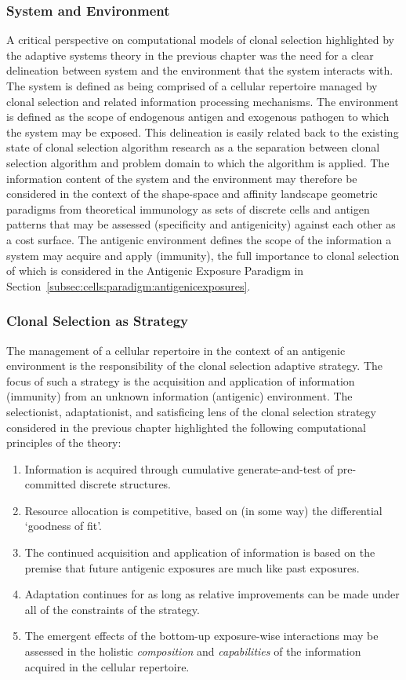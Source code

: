 \subsubsection{System and Environment}
A critical perspective on computational models of clonal selection highlighted by the adaptive systems theory in the previous chapter was the need for a clear delineation between system and the environment that the system interacts with. The system is defined as being comprised of a cellular repertoire managed by clonal selection and related information processing mechanisms. The environment is defined as the scope of endogenous antigen and exogenous pathogen to which the system may be exposed. This delineation is easily related back to the existing state of clonal selection algorithm research as a the separation between clonal selection algorithm and problem domain to which the algorithm is applied. The information content of the system and the environment may therefore be considered in the context of the shape-space and affinity landscape geometric paradigms from theoretical immunology as sets of discrete cells and antigen patterns that may be assessed (specificity and antigenicity) against each other as a cost surface. The antigenic environment defines the scope of the information a system may acquire and apply (immunity), the full importance to clonal selection of which is considered in the Antigenic Exposure Paradigm in Section~\ref{subsec:cells:paradigm:antigenicexposures}.

%
%
\subsubsection{Clonal Selection as Strategy}
The management of a cellular repertoire in the context of an antigenic environment is the responsibility of the clonal selection adaptive strategy. The focus of such a strategy is the acquisition and application of information (immunity) from an unknown information (antigenic) environment. The selectionist, adaptationist, and satisficing lens of the clonal selection strategy considered in the previous chapter highlighted the following computational principles of the theory:

\begin{enumerate}
	\item Information is acquired through cumulative generate-and-test of pre-committed discrete structures. 
	\item Resource allocation is competitive, based on (in some way) the differential `goodness of fit'.
	\item The continued acquisition and application of information is based on the premise that future antigenic exposures are much like past exposures.
	\item Adaptation continues for as long as relative improvements can be made under all of the constraints of the strategy. 
	\item The emergent effects of the bottom-up exposure-wise interactions may be assessed in the holistic \emph{composition} and \emph{capabilities} of the information acquired in the cellular repertoire.	
\end{enumerate}

